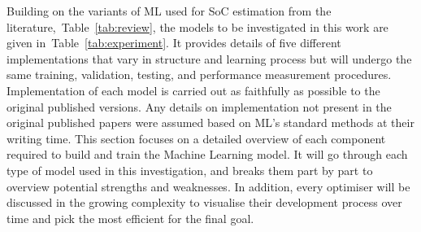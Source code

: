 %
Building on the variants of ML used for SoC estimation from the literature,~\mbox{Table~\ref{tab:review}}, the models to be investigated in this work are given in~\mbox{Table~\ref{tab:experiment}}.
It provides details of five different implementations that vary in structure and learning process but will undergo the same training, validation, testing, and performance measurement procedures.
Implementation of each model is carried out as faithfully as possible to the original published versions.
Any details on implementation not present in the original published papers were assumed based on ML's standard methods at their writing time.
This section focuses on a detailed overview of each component required to build and train the Machine Learning model.
It will go through each type of model used in this investigation, and breaks them part by part to overview potential strengths and weaknesses.
In addition, every optimiser will be discussed in the growing complexity to visualise their development process over time and pick the most efficient for the final goal.
